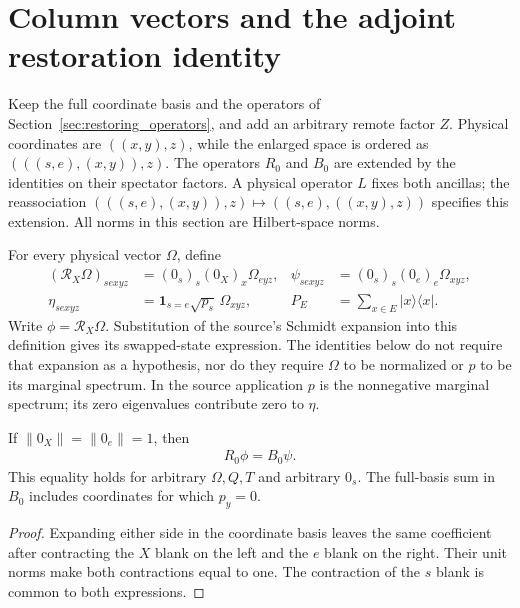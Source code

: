 \section{Column vectors and the adjoint restoration identity}
\label{sec:restoring_vectors}

Keep the full coordinate basis and the operators of
Section~\ref{sec:restoring_operators}, and add an arbitrary remote factor $Z$.
Physical coordinates are $((x,y),z)$, while the enlarged space is ordered as
$(((s,e),(x,y)),z)$. The operators $R_0$ and $B_0$ are extended by the
identities on their spectator factors. A physical operator $L$ fixes both
ancillas; the reassociation
$(((s,e),(x,y)),z)\mapsto((s,e),((x,y),z))$ specifies this extension.
All norms in this section are Hilbert-space norms.

\begin{definition}
    \label{def:restoring_vectors}
    \leanok
    For every physical vector $\Omega$, define
    \begin{align}
        (\mathcal R_X\Omega)_{sexyz}
            &=(0_s)_s(0_X)_x\Omega_{eyz},
            &\psi_{sexyz}&=(0_s)_s(0_e)_e\Omega_{xyz},\\
        \eta_{sexyz}&=\mathbf1_{s=e}\sqrt{p_s}\,\Omega_{xyz},
            &P_E&=\sum_{x\in E}|x\rangle\langle x|.
    \end{align}
    Write $\phi=\mathcal R_X\Omega$. Substitution of the source's Schmidt
    expansion into this definition gives its swapped-state expression.
    The identities below do not require that expansion as a hypothesis,
    nor do they require $\Omega$ to be normalized or $p$ to be its marginal
    spectrum. In the source application $p$ is the nonnegative marginal
    spectrum; its zero eigenvalues contribute zero to $\eta$.
\end{definition}

\begin{theorem}
    \label{thm:restoring_column_vector}
    \leanok
    If $\|0_X\|=\|0_e\|=1$, then
    \begin{align}
        R_0\phi=B_0\psi.
    \end{align}
    This equality holds for arbitrary $\Omega,Q,T$ and arbitrary $0_s$.
    The full-basis sum in $B_0$ includes coordinates for which $p_y=0$.
\end{theorem}
\begin{proof}\leanok
    Expanding either side in the coordinate basis leaves the same coefficient
    after contracting the $X$ blank on the left and the $e$ blank on the right.
    Their unit norms make both contractions equal to one. The contraction
    of the $s$ blank is common to both expressions.
\end{proof}

